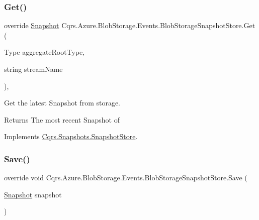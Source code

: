 \subsubsection{\texorpdfstring{Get()}{Get()}}
{\footnotesize\ttfamily override \hyperlink{classCqrs_1_1Snapshots_1_1Snapshot}{Snapshot} Cqrs.\+Azure.\+Blob\+Storage.\+Events.\+Blob\+Storage\+Snapshot\+Store.\+Get (\begin{DoxyParamCaption}\item[{Type}]{aggregate\+Root\+Type,  }\item[{string}]{stream\+Name }\end{DoxyParamCaption})\hspace{0.3cm}{\ttfamily [protected]}, {\ttfamily [virtual]}}



Get the latest Snapshot from storage. 

\begin{DoxyReturn}{Returns}
The most recent Snapshot of
\end{DoxyReturn}


Implements \hyperlink{classCqrs_1_1Snapshots_1_1SnapshotStore_ab2ecab1a665c0f2097929d028fe4ac69_ab2ecab1a665c0f2097929d028fe4ac69}{Cqrs.\+Snapshots.\+Snapshot\+Store}.

\mbox{\label{classCqrs_1_1Azure_1_1BlobStorage_1_1Events_1_1BlobStorageSnapshotStore_afb32196428d4c92c9542a94a1764fa59_afb32196428d4c92c9542a94a1764fa59}} 
\subsubsection{\texorpdfstring{Save()}{Save()}}
{\footnotesize\ttfamily override void Cqrs.\+Azure.\+Blob\+Storage.\+Events.\+Blob\+Storage\+Snapshot\+Store.\+Save (\begin{DoxyParamCaption}\item[{\hyperlink{classCqrs_1_1Snapshots_1_1Snapshot}{Snapshot}}]{snapshot }\end{DoxyParamCaption})\hspace{0.3cm}{\ttfamily [virtual]}}



